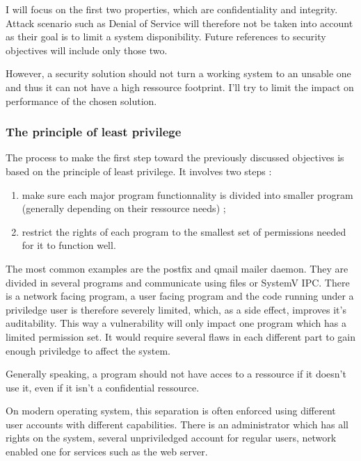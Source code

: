 \documentclass[pdftex,a4paper,titlepage,11pt]{article}
\begin{document}
\smallskip

I will focus on the first two properties, which are confidentiality and integrity. Attack scenario such as Denial of Service will therefore not be taken into account as their goal is to limit a system disponibility. Future references to security objectives will include only those two.

\bigskip

However, a security solution should not turn a working system to an unsable one and thus it can not have a high ressource footprint. I'll try to limit the impact on performance of the chosen solution.

\subsubsection{The principle of least privilege}

The process to make the first step toward the previously discussed objectives is based on the principle of least privilege. It involves two steps :
\begin{enumerate}
	\item make sure each major program functionnality is divided into smaller program (generally depending on their ressource needs) ;
	\item restrict the rights of each program to the smallest set of permissions needed for it to function well.
\end{enumerate}

\smallskip

The most common examples are the postfix and qmail mailer daemon. They are divided in several programs and communicate using files or SystemV IPC. There is a network facing program, a user facing program and the code running under a priviledge user is therefore severely limited, which, as a side effect, improves it's auditability. This way a vulnerability will only impact one program which has a limited permission set. It would require several flaws in each different part to gain enough priviledge to affect the system.

\bigskip

Generally speaking, a program should not have acces to a ressource if it doesn't use it, even if it isn't a confidential ressource.

\bigskip

On modern operating system, this separation is often enforced using different user accounts with different capabilities. There is an administrator which has all rights on the system, several unpriviledged account for regular users, network enabled one for services such as the web server.
\end{document}
